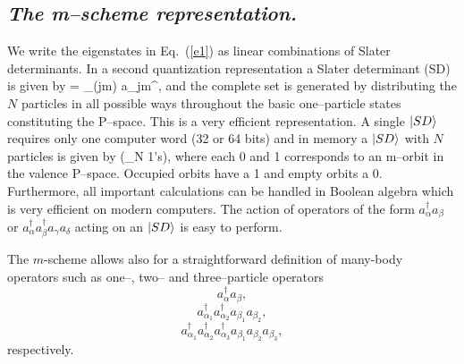 \subsection*{\it The m--scheme representation.}
%
We write the eigenstates in Eq.~(\ref{e1})  as  linear combinations
of Slater determinants. In a second quantization representation
a Slater determinant (SD) is given by
%
\be
{} = \prod_{(jm)\in {\nu}} a_{jm}^{\dagger},
\ee
%
and the complete set is generated by distributing the $N$ particles
in all possible ways throughout the basic one--particle states constituting
the P--space. This is a very efficient
representation. A single $\left| SD \right\rangle$ requires only one  computer word
(32 or 64 bits) and  in memory a $\left| SD \right\rangle$ with $N$ particles
is given by
%
\be
{} \longrightarrow (\underbrace{00111101010 \cdots}_{N 1's}),
\ee
%
where each 0 and 1 corresponds to an m--orbit in the valence
P--space. Occupied orbits  have a 1 and empty orbits a 0.
 Furthermore, all important calculations  can
be handled in Boolean algebra which is very efficient on modern computers.
The action  of operators of the form $a_{\alpha}^{\dagger} a_{\beta}$ or
$a_{\alpha}^{\dagger} a_{\beta}^{\dagger} a_{\gamma} a_{\delta}$
acting on an $\left| SD \right\rangle$ is easy to perform.

The $m$-scheme allows also for a straightforward definition of many-body operators 
such as one--, two-- and three--particle operators
     \begin{equation}
     a_{\alpha}^{\dagger} a_{\beta},
     \end{equation}
\begin{equation}
     a_{\alpha_1}^{\dagger}a_{\alpha_2}^{\dagger} a_{\beta_1} a_{\beta_2} ,
\end{equation}
\begin{equation}
     a_{\alpha_1}^{\dagger}a_{\alpha_2}^{\dagger}a_{\alpha_3}^{\dagger}
            a_{\beta_1} a_{\beta_2} a_{\beta_3},
\end{equation}
respectively.

